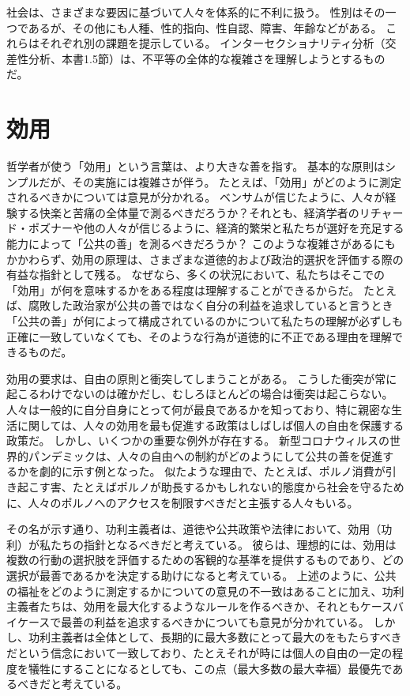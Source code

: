 \documentclass[paper=a4,book,openany]{jlreq} \usepackage{mystyle}
\begin{document}
社会は、さまざまな要因に基づいて人々を体系的に不利に扱う。
性別はその一つであるが、その他にも人種、性的指向、性自認、障害、年齢などがある。
これらはそれぞれ別の課題を提示している。
インターセクショナリティ分析（交差性分析、本書1.5節）は、不平等の全体的な複雑さを理解しようとするものだ。

\section{効用}

哲学者が使う「効用」という言葉は、より大きな善を指す。
基本的な原則はシンプルだが、その実施には複雑さが伴う。
たとえば、「効用」がどのように測定されるべきかについては意見が分かれる。
ベンサムが信じたように、人々が経験する快楽と苦痛の全体量で測るべきだろうか？それとも、経済学者のリチャード・ポズナーや他の人々が信じるように、経済的繁栄と私たちが選好を充足する能力によって「公共の善」を測るべきだろうか？ このような複雑さがあるにもかかわらず、効用の原理は、さまざまな道徳的および政治的選択を評価する際の有益な指針として残る。
なぜなら、多くの状況において、私たちはそこでの「効用」が何を意味するかをある程度は理解することができるからだ。
たとえば、腐敗した政治家が公共の善ではなく自分の利益を追求していると言うとき「公共の善」が何によって構成されているのかについて私たちの理解が必ずしも正確に一致していなくても、そのような行為が道徳的に不正である理由を理解できるものだ。

効用の要求は、自由の原則と衝突してしまうことがある。
こうした衝突が常に起こるわけでないのは確かだし、むしろほとんどの場合は衝突は起こらない。
人々は一般的に自分自身にとって何が最良であるかを知っており、特に親密な生活に関しては、人々の効用を最も促進する政策はしばしば個人の自由を保護する政策だ。
しかし、いくつかの重要な例外が存在する。
新型コロナウィルスの世界的パンデミックは、人々の自由への制約がどのようにして公共の善を促進するかを劇的に示す例となった。
似たような理由で、たとえば、ポルノ消費が引き起こす害、たとえばポルノが助長するかもしれない的態度から社会を守るために、人々のポルノへのアクセスを制限すべきだと主張する人々もいる。

その名が示す通り、功利主義者は、道徳や公共政策や法律において、効用（功利）が私たちの指針となるべきだと考えている。
彼らは、理想的には、効用は複数の行動の選択肢を評価するための客観的な基準を提供するものであり、どの選択が最善であるかを決定する助けになると考えている。
上述のように、公共の福祉をどのように測定するかについての意見の不一致はあることに加え、功利主義者たちは、効用を最大化するようなルールを作るべきか、それともケースバイケースで最善の利益を追求するべきかについても意見が分かれている。
しかし、功利主義者は全体として、長期的に最大多数にとって最大のをもたらすべきだという信念において一致しており、たとえそれが時には個人の自由の一定の程度を犠牲にすることになるとしても、この点（最大多数の最大幸福）最優先であるべきだと考えている。
\end{document}
